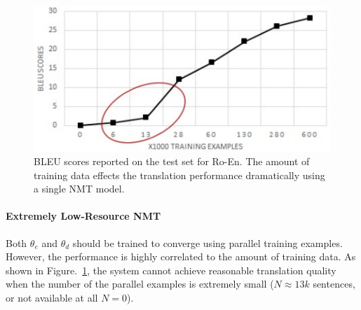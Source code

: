 \begin{figure}[t]
	\includegraphics[width=\linewidth]{figs/ulr/data_matters.pdf}
\caption{\label{fig.data_size} BLEU scores reported on the test set for Ro-En. The amount of training data effects the translation performance dramatically using a single NMT model.}\vspace{-10pt}	
 \end{figure}

\paragraph{Extremely Low-Resource NMT} Both $\theta_e$ and $\theta_d$ should be trained to converge using parallel training examples. However, the performance is highly correlated to the amount of training data.  As shown in Figure.~\ref{fig.data_size}, the system cannot achieve reasonable translation quality when the number of the parallel examples is extremely small ($N \approx 13k$ sentences,  or not available at all $N =0$).



